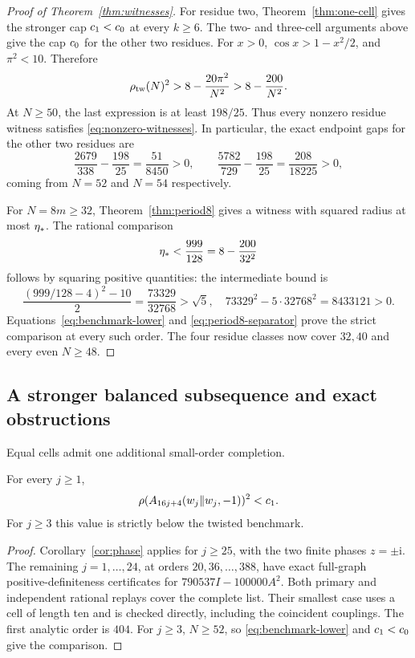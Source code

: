 \begin{proof}[Proof of Theorem~\ref{thm:witnesses}]
For residue two, Theorem~\ref{thm:one-cell} gives the stronger cap
$c_1<c_0$ at every $k\ge6$. The two- and three-cell arguments above
give the cap $c_0$ for the other two residues.
For $x>0$, $\cos x>1-x^2/2$, and $\pi^2<10$. Therefore
\begin{equation}
 \rho_{\mathrm{tw}}(N)^2>8-\frac{20\pi^2}{N^2}>8-\frac{200}{N^2}.
 \label{eq:benchmark-lower}
\end{equation}
At $N\ge50$, the last expression is at least $198/25$.
Thus every nonzero residue witness satisfies
\eqref{eq:nonzero-witnesses}. In particular, the exact endpoint gaps for
the other two residues are
\[
 \frac{2679}{338}-\frac{198}{25}=\frac{51}{8450}>0,
 \qquad
 \frac{5782}{729}-\frac{198}{25}=\frac{208}{18225}>0,
\]
coming from $N=52$ and $N=54$ respectively.

For $N=8m\ge32$, Theorem~\ref{thm:period8} gives a witness with squared
radius at most $\eta_*$. The rational comparison
\begin{equation}
 \eta_*<\frac{999}{128}=8-\frac{200}{32^2}
 \label{eq:period8-separator}
\end{equation}
follows by squaring positive quantities: the intermediate bound is
\[
 \frac{(999/128-4)^2-10}{2}=\frac{73329}{32768}>\sqrt5,
 \quad 73329^2-5\cdot32768^2=8433121>0.
\]
Equations~\eqref{eq:benchmark-lower} and
\eqref{eq:period8-separator} prove the strict comparison at every such
order. The four residue classes now cover $32,40$ and every even $N\ge48$.
\end{proof}

\subsection{A stronger balanced subsequence and exact obstructions}

Equal cells admit one additional small-order completion.
\begin{proposition}\label{prop:balanced-sharp}
For every $j\ge1$,
\[
 \rho(A_{16j+4}(w_j\|w_j,-1))^2<c_1.
\]
For $j\ge3$ this value is strictly below the twisted benchmark.
\end{proposition}
\begin{proof}
Corollary~\ref{cor:phase} applies for $j\ge25$, with the two finite
phases $z=\pm\mathrm i$. The remaining $j=1,\ldots,24$, at orders
$20,36,\ldots,388$, have exact full-graph positive-definiteness certificates
for $790537I-100000A^2$. Both primary and independent rational replays
cover the complete list. Their smallest case uses a cell of length ten
and is checked directly, including the coincident couplings.
The first analytic order is $404$. For $j\ge3$, $N\ge52$, so
\eqref{eq:benchmark-lower} and $c_1<c_0$ give the comparison.
\end{proof}

